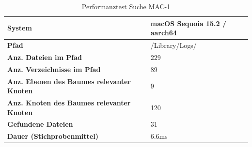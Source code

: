 \documentclass[a4paper,12pt]{report}
\begin{document}
    \begin{table}[h!]
        \centering
        \setlength{\leftmargini}{0.8cm}
        \begin{tabular}{|p{7cm}|p{5cm}|}
            \hline
            \textbf{System}                                            & macOS Sequoia 15.2 / aarch64 \\ \hline
            \textbf{Pfad}                                              & /Library/Logs/               \\ \hline
            \textbf{Anz. Dateien im Pfad}                              & 229                          \\ \hline
            \textbf{Anz. Verzeichnisse im Pfad}                        & 89                           \\ \hline
            \textbf{Anz. Ebenen \newline des Baumes relevanter Knoten} & 9                            \\ \hline
            \textbf{Anz. Knoten \newline des Baumes relevanter Knoten} & 120                          \\ \hline
            \textbf{Gefundene Dateien}                                 & 31                           \\ \hline
            \textbf{Dauer (Stichprobenmittel)}                         & 6.6ms                        \\ \hline
        \end{tabular}
        \caption{Performanztest Suche MAC-1}\label{tab:perf-search-mac-1}
    \end{table}
\end{document}
